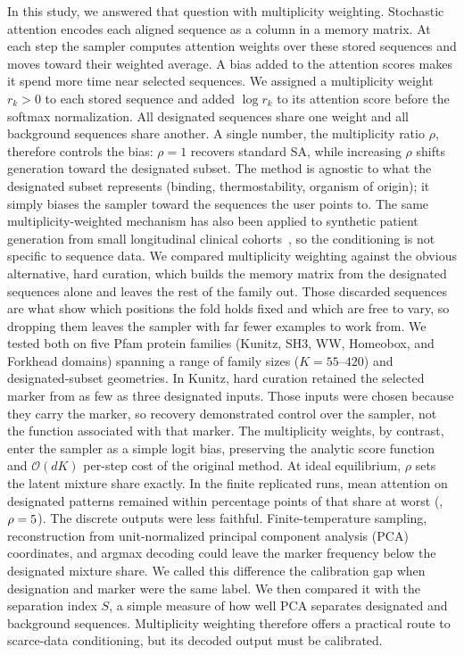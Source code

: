 In this study, we answered that question with multiplicity weighting. Stochastic attention
encodes each aligned sequence as a column in a memory matrix. At each step the sampler
computes attention weights over these stored sequences and moves toward their weighted average.
A bias added to the attention scores makes it spend more time near selected sequences. We
assigned a multiplicity weight $r_k > 0$ to each stored sequence and added $\log r_k$ to its
attention score before the softmax normalization. All designated sequences share one weight and
all background sequences share another. A single number, the multiplicity ratio $\rho$,
therefore controls the bias: $\rho = 1$ recovers standard SA, while increasing $\rho$ shifts
generation toward the designated subset.
The method is agnostic to what the designated subset represents (binding, thermostability, organism of origin); it simply biases the sampler toward the sequences the user points to. 
The same multiplicity-weighted mechanism has also been applied to synthetic patient generation
from small longitudinal clinical cohorts~\cite{varnerSAPatient2026}, so the conditioning is not
specific to sequence data. We compared multiplicity weighting against the obvious alternative,
hard curation, which builds the memory matrix from the designated sequences alone and leaves
the rest of the family out. Those discarded sequences are what show which
positions the fold holds fixed and which are free to vary, so dropping them leaves the sampler
with far fewer examples to work from. We tested both on five
Pfam protein families (Kunitz, SH3, WW, Homeobox, and Forkhead domains) spanning a range of
family sizes ($K = 55$--$420$) and designated-subset geometries. In Kunitz, hard curation
retained the selected marker from as few as three designated inputs. Those inputs were chosen
because they carry the marker, so recovery demonstrated control over the sampler, not the
function associated with that marker. The multiplicity weights,
by contrast, enter the sampler as a simple logit bias, preserving the analytic score function and
$\mathcal{O}(dK)$ per-step cost of the original method. At ideal equilibrium, $\rho$ sets the
latent mixture share exactly. In the finite replicated runs, mean attention on designated
patterns remained within \AttnMaxDevPts{} percentage points of that share at worst
(\AttnMaxDevFamily{}, $\rho=5$). The discrete outputs were less faithful.
Finite-temperature sampling, reconstruction from unit-normalized principal component analysis
(PCA) coordinates, and argmax decoding could leave the marker frequency below the designated
mixture share. We called this difference the calibration gap when designation and marker were
the same label. We then compared it with the separation index $S$, a simple measure of how well
PCA separates designated and background sequences. Multiplicity weighting therefore offers a
practical route to scarce-data conditioning, but its decoded output must be calibrated.
